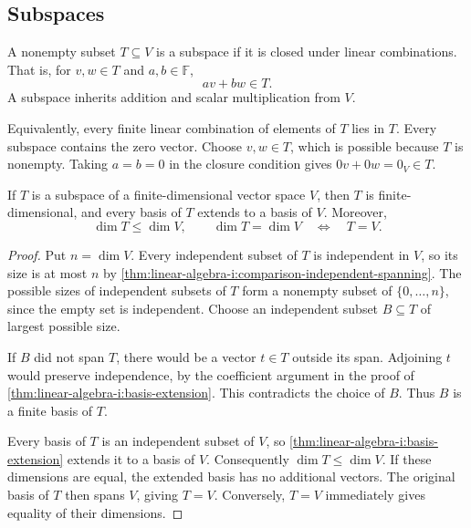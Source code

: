 \subsection{Subspaces}

\begin{definition}
  A nonempty subset \(T\subseteq V\) is a subspace if it is closed under
  linear combinations. That is, for \(v,w\in T\) and \(a,b\in\mathbb F\),
  \[
    av+bw\in T.
  \]
  A subspace inherits addition and scalar multiplication from \(V\).
\end{definition}

Equivalently, every finite linear combination of elements of \(T\) lies in
\(T\). Every subspace contains the zero vector. Choose \(v,w\in T\),
which is possible because \(T\) is nonempty. Taking \(a=b=0\) in the
closure condition gives \(0v+0w=0_V\in T\).

\begin{pendingreview}
\begin{proposition}
  \label{thm:linear-algebra-i:finite-dimensional-subspaces}
  If \(T\) is a subspace of a finite-dimensional vector space \(V\), then
  \(T\) is finite-dimensional, and every basis of \(T\) extends to a basis
  of \(V\). Moreover,
  \[
    \dim T\leq\dim V,
    \qquad
    \dim T=\dim V\quad\Longleftrightarrow\quad T=V.
  \]
\end{proposition}

\begin{proof}
  Put \(n=\dim V\). Every independent subset of \(T\) is independent
  in \(V\), so its size is at most \(n\) by
  \autoref{thm:linear-algebra-i:comparison-independent-spanning}.
  The possible sizes of independent subsets of \(T\) form a nonempty
  subset of \(\{0,\ldots,n\}\), since the empty set is independent.
  Choose an independent subset \(B\subseteq T\) of largest possible size.

  If \(B\) did not span \(T\), there would be a vector \(t\in T\)
  outside its span. Adjoining \(t\) would preserve independence, by the
  coefficient argument in the proof of
  \autoref{thm:linear-algebra-i:basis-extension}. This contradicts the
  choice of \(B\). Thus \(B\) is a finite basis of \(T\).

  Every basis of \(T\) is an independent subset of \(V\), so
  \autoref{thm:linear-algebra-i:basis-extension} extends it to a basis of
  \(V\). Consequently \(\dim T\leq\dim V\). If these dimensions are
  equal, the extended basis has no additional vectors. The original basis
  of \(T\) then spans \(V\), giving \(T=V\). Conversely, \(T=V\)
  immediately gives equality of their dimensions.
\end{proof}
\end{pendingreview}

